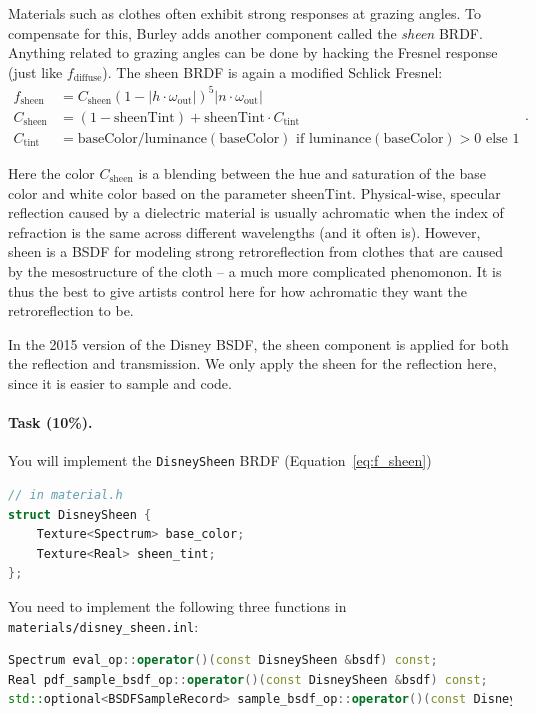Materials such as clothes often exhibit strong responses at grazing angles. To compensate for this, Burley adds another component called the \emph{sheen} BRDF. Anything related to grazing angles can be done by hacking the Fresnel response (just like $f_{\text{diffuse}}$). The sheen BRDF is again a modified Schlick Fresnel:
\begin{equation}
\begin{aligned}
f_{\text{sheen}} &= C_{\text{sheen}} (1 - |h \cdot \omega_{\text{out}}|)^5 |n \cdot \omega_{\text{out}}| \\
C_{\text{sheen}} &= \left(1 - \text{sheenTint}\right) + \text{sheenTint} \cdot C_{\text{tint}} \\
C_{\text{tint}} &= \text{baseColor} / \text{luminance}(\text{baseColor}) \text{ if } \text{luminance}(\text{baseColor}) > 0 \text{ else } 1
\end{aligned}.
\label{eq:f_sheen}
\end{equation}

Here the color $C_{\text{sheen}}$ is a blending between the hue and saturation of the base color and white color based on the parameter $\text{sheenTint}$. Physical-wise, specular reflection caused by a dielectric material is usually achromatic when the index of refraction is the same across different wavelengths (and it often is). However, sheen is a BSDF for modeling strong retroreflection from clothes that are caused by the mesostructure of the cloth -- a much more complicated phenomonon. It is thus the best to give artists control here for how achromatic they want the retroreflection to be.

In the 2015 version of the Disney BSDF, the sheen component is applied for both the reflection and transmission. We only apply the sheen for the reflection here, since it is easier to sample and code.

\paragraph{Task (10\%).} You will implement the \lstinline{DisneySheen} BRDF (Equation~\ref{eq:f_sheen})
\begin{lstlisting}[language=c++]
// in material.h
struct DisneySheen {
    Texture<Spectrum> base_color;
    Texture<Real> sheen_tint;
};
\end{lstlisting}

You need to implement the following three functions in \lstinline{materials/disney_sheen.inl}:
\begin{lstlisting}[language=c++]
Spectrum eval_op::operator()(const DisneySheen &bsdf) const;
Real pdf_sample_bsdf_op::operator()(const DisneySheen &bsdf) const;
std::optional<BSDFSampleRecord> sample_bsdf_op::operator()(const DisneySheen &bsdf) const;
\end{lstlisting}

